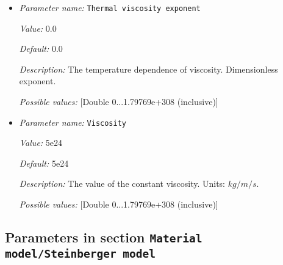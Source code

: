\begin{itemize}
{\it Value:} 2e-5


{\it Default:} 2e-5


{\it Description:} The value of the thermal expansion coefficient $\beta$. Units: $1/K$.


{\it Possible values:} [Double 0...1.79769e+308 (inclusive)]
\item {\it Parameter name:} {\tt Thermal viscosity exponent}
\label{parameters:Material model/Stamps model/Thermal viscosity exponent}


{\it Value:} 0.0


{\it Default:} 0.0


{\it Description:} The temperature dependence of viscosity. Dimensionless exponent.


{\it Possible values:} [Double 0...1.79769e+308 (inclusive)]
\item {\it Parameter name:} {\tt Viscosity}
\label{parameters:Material model/Stamps model/Viscosity}


{\it Value:} 5e24


{\it Default:} 5e24


{\it Description:} The value of the constant viscosity. Units: $kg/m/s$.


{\it Possible values:} [Double 0...1.79769e+308 (inclusive)]
\end{itemize}

\subsection{Parameters in section \tt Material model/Steinberger model}
\label{parameters:Material_20model/Steinberger_20model}

